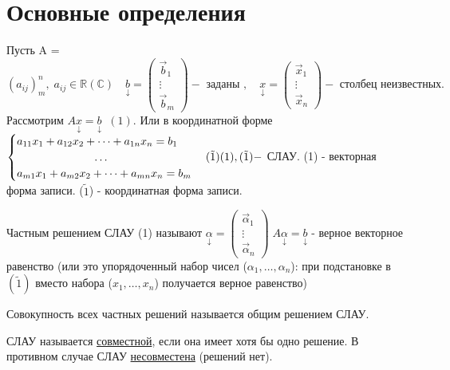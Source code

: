 \documentclass[../main.tex]{subfiles}
\begin{document}
\section{Основные определения}
\noindent Пусть A = $(a_{ij})_{m}^{n},\; a_{ij}\in\mathbb{R}(\mathbb{C})\quad \underset{\downarrow}{b}=\begin{pmatrix} \vec{b}_{1}\\ \vdots\\ \vec{b}_{m} \end{pmatrix}- \text{ заданы },\quad \underset{\downarrow}{x}=\begin{pmatrix} \vec{x}_{1}\\ \vdots\\ \vec{x}_{n} \end{pmatrix} -\text{ столбец неизвестных.}$\\ 
Рассмотрим $A \underset{\downarrow}{x}=\underset{\downarrow}{b}\;\;(1).$ Или в координатной форме $\begin{cases}
    a_{11}x_{1}+a_{12}x_{2}+\dots+a_{1n}x_{n}=b_{1}\\
    \phantom{a_{11}x_{1}+a_{12}x_{2}+} \dots\\
    a_{m1}x_{1}+a_{m2}x_{2}+\dots+a_{mn}x_{n}=b_{m}
\end{cases}(\tilde{1})\\ (1),(\tilde{1}) - $ СЛАУ. (1) - векторная форма записи. ($\tilde{1}$) - координатная форма записи. 
\begin{definition}
    Частным решением СЛАУ (1) называют $\underset{\downarrow}{\alpha}=\begin{pmatrix} \vec{\alpha}_{1}\\ \vdots\\ \vec{\alpha}_{n} \end{pmatrix}\; A  \underset{\downarrow}{\alpha}=\underset{\downarrow}{b}$ - верное векторное равенство (или это упорядоченный набор чисел ($\alpha_{1},\dots,\alpha_{n}$): при подстановке в $(\tilde{1})$ вместо набора ($x_{1},\dots,x_{n}$) получается верное равенство)
\end{definition}
\begin{definition}
    Совокупность всех частных решений называется общим решением СЛАУ.
\end{definition}
\begin{definition}
    СЛАУ называется \underline{совместной}, если она имеет хотя бы одно решение. В противном случае СЛАУ \underline{несовместена} (решений нет).
\end{definition}
\end{document}
